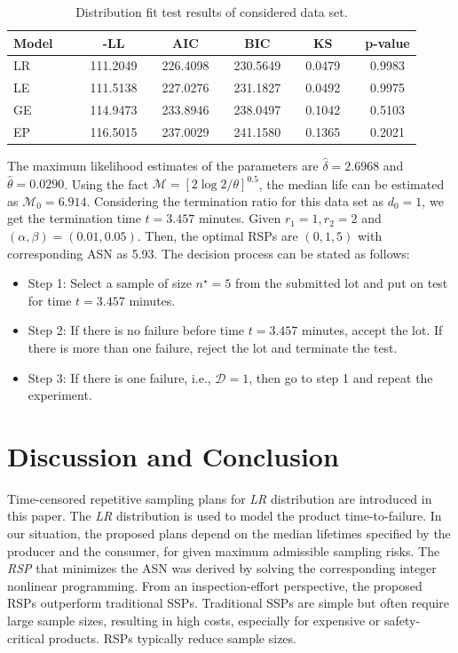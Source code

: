 \documentclass[twoside]{article}
\begin{document}
\begin{table}
\centering
\caption{Distribution fit test results of considered data set.}\label{tab03}
\begin{tabular}{lccccccccccc}
\hline
\textbf{Model} &&& \textbf{-LL} && \textbf{AIC} && \textbf{BIC} && \textbf{KS} && \textbf{p-value} \\
\hline
LR     &&& 111.2049& & 226.4098 && 230.5649 && 0.0479 && 0.9983 \\
LE    &&& 111.5138 && 227.0276 && 231.1827 && 0.0492 &&0.9975 \\
GE     && & 114.9473 && 233.8946 && 238.0497 && 0.1042 &&0.5103 \\
EP      &&& 116.5015 && 237.0029 && 241.1580 && 0.1365 && 0.2021 \\
\hline
\end{tabular}
\end{table}
The maximum likelihood estimates of the  parameters are $\hat \delta=2.6968$ and $\hat\theta=0.0290$. 
 Using the fact $\mathcal{M}=[2\log2/\theta]^{0.5}$, the median life can be estimated as $\mathcal{M}_0=6.914$. Considering the termination ratio for this data set  as $d_0=1$, we  get the termination time $t=3.457$ minutes. Given $r_1=1, r_2=2$ and $(\alpha,\beta)=(0.01,0.05)$.
 Then, the optimal RSPs  are $(0,1,5)$ with corresponding ASN as 5.93.
The decision process can be stated as follows: 
\begin{itemize}
\item Step 1: Select a sample of size $n^{\star}=5$ from the submitted lot and put on test for  time $t=3.457$ minutes.
\item Step 2: If there is no failure before time $t=3.457$ minutes, accept the lot. If  there is more than  one  failure,  reject the lot and terminate the test. 
\item Step 3: If  there is one failure, i.e., $\mathcal{D}=1$, then go to step 1 and repeat the experiment.
\end{itemize}



\section*{Discussion and Conclusion}   
Time-censored repetitive sampling plans for \textit{LR} distribution are introduced in this paper. 
The \textit{LR} distribution is used to model the product time-to-failure.
In our situation, the proposed plans depend on the median lifetimes specified by the producer and the consumer, for given maximum admissible sampling risks. 
The \textit{RSP} that minimizes the ASN was derived by solving the corresponding integer nonlinear programming. From an inspection-effort perspective, the proposed RSPs outperform traditional SSPs. Traditional SSPs are simple but often require large sample sizes, resulting in high costs, especially for expensive or safety-critical products. RSPs typically reduce sample sizes. 
\end{document}
